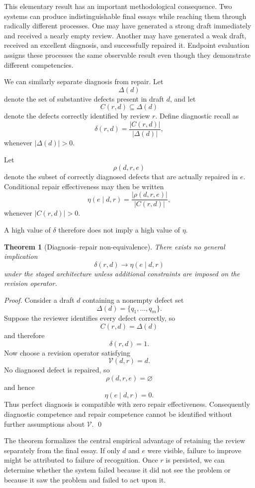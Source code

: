 \documentclass[11pt]{article}
\newtheorem{theorem}[definition]{Theorem}
\newcommand{\Revise}{\mathcal{V}}
\begin{document}
This elementary result has an important methodological consequence. Two systems can produce indistinguishable final essays while reaching them through radically different processes. One may have generated a strong draft immediately and received a nearly empty review. Another may have generated a weak draft, received an excellent diagnosis, and successfully repaired it. Endpoint evaluation assigns these processes the same observable result even though they demonstrate different competencies.

We can similarly separate diagnosis from repair. Let
\[
    \Delta(d)
\]
denote the set of substantive defects present in draft \(d\), and let
\[
    C(r,d)\subseteq\Delta(d)
\]
denote the defects correctly identified by review \(r\). Define diagnostic recall as
\[
    \delta(r,d)
    =
    \frac{|C(r,d)|}{|\Delta(d)|},
\]
whenever \(|\Delta(d)|>0\).

Let
\[
    \rho(d,r,e)
\]
denote the subset of correctly diagnosed defects that are actually repaired in \(e\). Conditional repair effectiveness may then be written
\[
    \eta(e\mid d,r)
    =
    \frac{|\rho(d,r,e)|}{|C(r,d)|},
\]
whenever \(|C(r,d)|>0\).

A high value of \(\delta\) therefore does not imply a high value of \(\eta\).

\begin{theorem}[Diagnosis--repair non-equivalence]
There exists no general implication
\[
    \delta(r,d)\rightarrow \eta(e\mid d,r)
\]
under the staged architecture unless additional constraints are imposed on the revision operator.
\end{theorem}

\begin{proof}
Consider a draft \(d\) containing a nonempty defect set
\[
    \Delta(d)=\{q_1,\ldots,q_m\}.
\]
Suppose the reviewer identifies every defect correctly, so
\[
    C(r,d)=\Delta(d)
\]
and therefore
\[
    \delta(r,d)=1.
\]
Now choose a revision operator satisfying
\[
    \Revise(d,r)=d.
\]
No diagnosed defect is repaired, so
\[
    \rho(d,r,e)=\varnothing
\]
and hence
\[
    \eta(e\mid d,r)=0.
\]
Thus perfect diagnosis is compatible with zero repair effectiveness. Consequently diagnostic competence and repair competence cannot be identified without further assumptions about \(\Revise\). \qed
\end{proof}

The theorem formalizes the central empirical advantage of retaining the review separately from the final essay. If only \(d\) and \(e\) were visible, failure to improve might be attributed to failure of recognition. Once \(r\) is persisted, we can determine whether the system failed because it did not see the problem or because it saw the problem and failed to act upon it.
\end{document}
